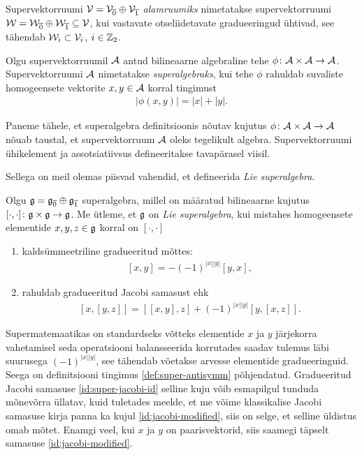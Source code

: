 Supervektorruumi $\mathcal{V} = \mathcal{V}_{\overline{0}} \oplus \mathcal{V}_{\overline{1}}$
\emph{alamruumiks} nimetatakse supervektorruumi
$\mathcal{W} = \mathcal{W}_{\overline{0}} \oplus \mathcal{W}_{\overline{1}} \subseteq \mathcal{V}$, kui
vastavate otseliidetavate gradueeringud ühtivad, see tähendab
$\mathcal{W}_i \subset \mathcal{V}_i$, $i \in \mathbb{Z}_2$.

\begin{dfn}
    Olgu supervektorruumil $\mathcal{A}$ antud bilineaarne algebraline tehe
    $\phi \colon \mathcal{A} \times \mathcal{A} \to \mathcal{A}$. Supervektorruumi $\mathcal{A}$ nimetatakse
    \emph{superalgebraks}, kui tehe $\phi$ rahuldab suvaliste homogeensete
    vektorite $x, y \in \mathcal{A}$ korral tingimust
    \begin{align}\label{def:superalgebra-parity}
        \left|\phi(x, y)\right| = |x| + |y|.
    \end{align}
\end{dfn}

Paneme tähele, et superalgebra definitsioonis nõutav kujutus
$\phi \colon \mathcal{A} \times \mathcal{A} \to \mathcal{A}$ nõuab taustal, et supervektorruum
$\mathcal{A}$ oleks tegelikult algebra. Supervektorruumi ühikelement ja
assotsiatiivsus defineeritakse tavapärasel viisil.

Sellega on meil olemas piisvad vahendid, et defineerida
\emph{Lie superalgebra}.

\begin{dfn}
    Olgu $\mathfrak{g} = \mathfrak{g}_{\overline{0}} \oplus \mathfrak{g}_{\overline{1}}$ superalgebra,
    millel on määratud bilineaarne kujutus
    $[\cdot, \cdot] \colon \mathfrak{g} \times \mathfrak{g} \to \mathfrak{g}$. Me ütleme, et $\mathfrak{g}$
    on \emph{Lie superalgebra}, kui mistahes homogeensete elementide
    $x, y, z \in \mathfrak{g}$ korral on $[\cdot, \cdot]$
    \begin{enumerate}
        \item kaldsümmeetriline gradueeritud mõttes:
            \begin{align}\label{def:super-antisymm}
                [x, y] = -(-1)^{|x||y|}[y, x],
            \end{align}
        \item rahuldab gradueeritud Jacobi samasust ehk
            \begin{align}\label{id:super-jacobi-id}
                [x, [y, z]] = [[x, y], z] + (-1)^{|x||y|}[y, [x, z]].
            \end{align}
    \end{enumerate}
\end{dfn}

Supermatemaatikas on standardseks võtteks elementide $x$ ja $y$ järjekorra
vahetamisel seda operatsiooni balansseerida korrutades saadav tulemus
läbi suurusega $(-1)^{|x||y|}$, see tähendab võetakse arvesse elementide
gradueeringuid.
Seega on definitsiooni tingimus \eqref{def:super-antisymm} põhjendatud.
Gradueeritud Jacobi samasuse \eqref{id:super-jacobi-id} selline kuju võib
esmapilgul tunduda mõnevõrra üllatav, kuid tuletades meelde, et me võime
klassikalise Jacobi samasuse kirja panna ka kujul \eqref{id:jacobi-modified},
siis on selge, et selline üldistus omab mõtet. Enamgi veel, kui $x$ ja $y$ on
paarisvektorid, siis saamegi täpselt samasuse \eqref{id:jacobi-modified}.

